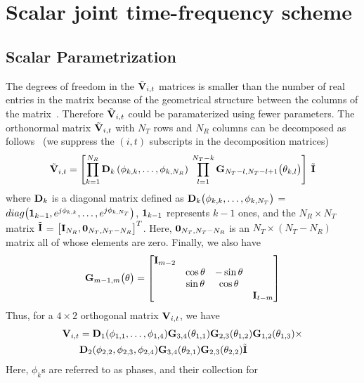 \documentclass[journal,10pt,twocolumn]{IEEEtran}
\def\bD{{\bf D}}
\def\bG{{\bf G}}
\def\bI{{\bf I}}
\def\bV{{\bf V}}
\begin{document}
\section{Scalar joint time-frequency scheme}
\subsection{Scalar Parametrization}
\label{givens}
The degrees of freedom in the $\tilde{\bV}_{i,t}$ matrices is smaller
than the number of real entries in the matrix because of the
geometrical structure between the columns of the
matrix~\cite{4114278}.  Therefore $\tilde{\bV}_{i,t}$ could be paramaterized
using fewer parameters.
The orthonormal matrix $\tilde{\bV}_{i,t}$ with
$N_T$ rows and $N_R$ columns can be decomposed as
follows~\cite{4114278} (we suppress the $(i, t)$ subscripts in the
decomposition matrices)
\begin{equation}
\tilde{\bV}_{i,t} = \left[\prod_{k=1}^{N_{R}} \bD_{k} \left( \phi_{k,k},\ldots , \phi_{k,N_{R}} \right) \:  \prod_{l=1}^{N_{T}-k} \bG_{N_{T}-l,N_{T} -l+1} \big( \theta_{k,l}\big)  \right] \: \tilde{\bI}
\end{equation}
where $\bD_{k}$ is a diagonal matrix defined as
$\bD_{k}\big(\phi_{k,k}, \ldots, \phi_{k,N_T } \big)$ =
$\mbox{diag}\big( {\bf 1}_{k-1}, e^{j\phi_{k,k}},\ldots,
e^{j\phi_{k,N_T }} \big)$, ${\bf 1}_{k-1}$ represents $k-1$ ones,
and the $N_R \times N_T$ matrix $\tilde{\bI}$ =
$\big[\bI_{N_R }, {\bf 0}_{N_T ,N_T -N_R}\big]^{T}$. Here,
${\bf 0}_{N_T ,N_T -N_R }$ is an $N_T\times (N_T - N_R)$ matrix all of
whose elements are zero. Finally, we also have
\begin{equation}
\bG_{m-1,m}\big(\theta\big)  =
\begin{bmatrix}
\bI_{m-2} & & & \\
& \cos\theta & -\sin\theta & \\
& \sin\theta & \cos\theta & \\
& & & \bI_{t-m}
\end{bmatrix}
\end{equation}
Thus, for a $4 \times 2$ orthogonal matrix $\bV_{i,t}$, we have
\begin{align*}
  \bV_{i,t} & =
  \bD_{1}(\phi_{1,1},\ldots,\phi_{1,4})\bG_{3,4}(\theta_{1,1})
  \bG_{2,3}(\theta_{1,2}) \bG_{1,2}(\theta_{1,3})\times\\
& \bD_{2}(\phi_{2,2},\phi_{2,3},\phi_{2,4}) \bG_{3,4}(\theta_{2,1}) \bG_{2,3}(\theta_{2,2})\tilde{\bI}
\end{align*}
Here, $\phi_{k}$s are referred to as phases, and their collection for
\end{document}
